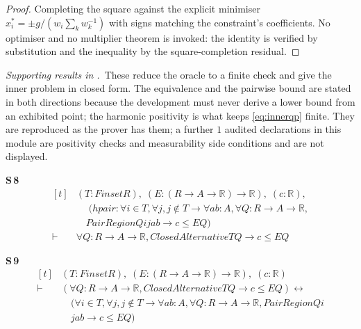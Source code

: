 \begin{proof}
Completing the square against the explicit minimiser
$x_{i}^{*}=\pm g/(w_{i}\sum_{k}w_{k}^{-1})$ with signs matching the constraint's
coefficients. No optimiser and no multiplier theorem is invoked: the identity is verified by
substitution and the inequality by the square-completion residual.
\end{proof}


\noindent\emph{Supporting results in .}~These reduce the oracle to a finite check and give the inner problem in closed form. The equivalence and the pairwise bound are stated in both directions because the development must never derive a lower bound from an exhibited point; the harmonic positivity is what keeps \eqref{eq:innerqp} finite. They are reproduced as the prover has them; a further $1$ audited declarations in this module are positivity checks and measurability side conditions and are not displayed.

\noindent\textbf{S\,8}\quad{}
{\footnotesize\[ \begin{aligned}[t]
&(\mathit{T} : \mathit{Finset} \mathit{R}),\; (\mathit{E} : (\mathit{R} \to \mathit{A} \to \mathbb{R} ) \to \mathbb{R} ),\; (\mathit{c} : \mathbb{R} ),\\
&\quad \; (\mathit{hpair} : \forall \mathit{i} \in \mathit{T}, \forall \mathit{j}, \mathit{j} \notin \mathit{T} \to \forall \mathit{a} \mathit{b} : \mathit{A}, \forall \mathit{Q} : \mathit{R} \to \mathit{A} \to \mathbb{R} ,\\
&\quad \mathit{PairRegion} \mathit{Q} \mathit{i} \mathit{j} \mathit{a} \mathit{b} \to \mathit{c} \leq \mathit{E} \mathit{Q})\\
\vdash\;&\forall \mathit{Q} : \mathit{R} \to \mathit{A} \to \mathbb{R} , \mathit{ClosedAlternative} \mathit{T} \mathit{Q} \to \mathit{c} \leq \mathit{E} \mathit{Q}
\end{aligned} \]}

\noindent\textbf{S\,9}\quad{}
{\footnotesize\[ \begin{aligned}[t]
&(\mathit{T} : \mathit{Finset} \mathit{R}),\; (\mathit{E} : (\mathit{R} \to \mathit{A} \to \mathbb{R} ) \to \mathbb{R} ),\; (\mathit{c} : \mathbb{R} )\\
\vdash\;&(\forall \mathit{Q} : \mathit{R} \to \mathit{A} \to \mathbb{R} , \mathit{ClosedAlternative} \mathit{T} \mathit{Q} \to \mathit{c} \leq \mathit{E} \mathit{Q}) \leftrightarrow\\
&\quad (\forall \mathit{i} \in \mathit{T}, \forall \mathit{j}, \mathit{j} \notin \mathit{T} \to \forall \mathit{a} \mathit{b} : \mathit{A}, \forall \mathit{Q} : \mathit{R} \to \mathit{A} \to \mathbb{R} , \mathit{PairRegion} \mathit{Q} \mathit{i}\\
&\quad \mathit{j} \mathit{a} \mathit{b} \to \mathit{c} \leq \mathit{E} \mathit{Q})
\end{aligned} \]}

